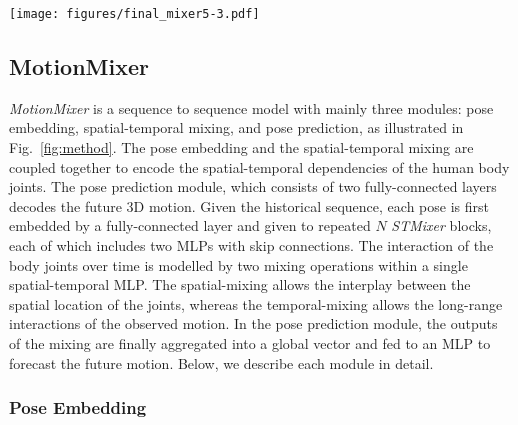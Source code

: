 \documentclass{article}
\begin{document}
\begin{figure*}[ht!]
    \centering
    \texttt{[image: figures/final\_mixer5-3.pdf]} 
    \caption{\textbf{Overview of the proposed MotionMixer}. It mainly consists of three modules: pose embedding, spatial-temporal mixing, and pose prediction. First, the pose embedding module linearly projects each of the past 3D body poses through a single fully-connected layer to a hidden dimension $C$. The learned features are then fed to $N$ \textit{STMixer} layers. Equipped with a spatial-MLP, a temporal-MLP and a squeeze-and-excitation (SE) block, \textit{STMixer} aims to learn fine-grained spatial-temporal dependencies of the human motion. The mixing blocks are shown on the right. In each layer, we depict how our framework aggregates information via spatial-temporal mixing. An MLP-based body pose prediction is then applied to the mixed features to forecast the future human motion.}
    \label{fig:method}
\end{figure*}

\subsection{MotionMixer}
\textit{MotionMixer} is a sequence to sequence model with mainly three modules: pose embedding, spatial-temporal mixing, and pose prediction, as illustrated in Fig.~\ref{fig:method}. The pose embedding and the spatial-temporal mixing are coupled together to encode the spatial-temporal dependencies of the human body joints. The pose prediction module, which consists of two fully-connected layers decodes the future 3D motion. Given the historical sequence, each pose is first embedded by a fully-connected layer and given to repeated $N$ \textit{STMixer} blocks, each of which includes two MLPs with skip connections. The interaction of the body joints over time is modelled by two mixing operations within a single spatial-temporal MLP. The spatial-mixing allows the interplay between the spatial location of the joints, whereas the temporal-mixing allows the long-range interactions of the observed motion. In the pose prediction module, the outputs of the mixing are finally aggregated into a global vector and fed to an MLP to forecast the future motion. Below, we describe each module in detail.

\subsubsection{Pose Embedding} 
\end{document}
